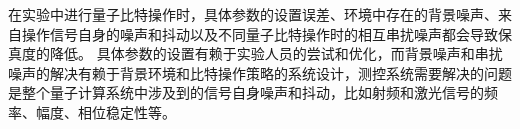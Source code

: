 
在实验中进行量子比特操作时，具体参数的设置误差、环境中存在的背景噪声、来自操作信号自身的噪声和抖动以及不同量子比特操作时的相互串扰噪声都会导致保真度的降低。
具体参数的设置有赖于实验人员的尝试和优化，而背景噪声和串扰噪声的解决有赖于背景环境和比特操作策略的系统设计，测控系统需要解决的问题是整个量子计算系统中涉及到的信号自身噪声和抖动，比如射频和激光信号的频率、幅度、相位稳定性等。

